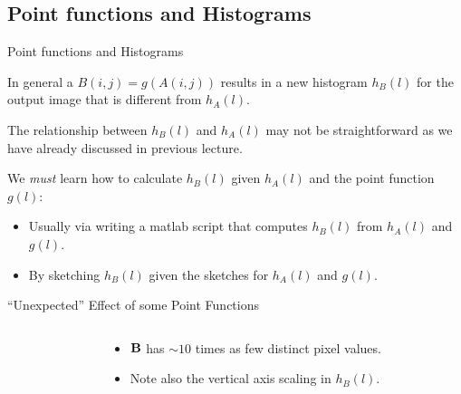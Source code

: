 \subsection{Point functions and Histograms}
%
%
\begin{slide}{Point functions and Histograms}
\begin{titlelist}{}{}

\item<2-> 
In general a  $B(i,j)=g(A(i,j))$
results in a new histogram $h_B(l)$ for the output image
that is different from $h_A(l)$.

\item<3-> 
The relationship between $h_B(l)$ and $h_A(l)$ may not be
straightforward as we have already discussed in previous lecture.

\item<4-> 
We {\em must} learn how to calculate $h_B(l)$ given $h_A(l)$
and the point function $g(l)$:

\begin{itemize}
\item<5-> 
 Usually via writing a matlab script that
computes $h_B(l)$ from $h_A(l)$ and $g(l)$.

\item<6-> 
 By sketching  $h_B(l)$
given the sketches for $h_A(l)$ and $g(l)$.
\end{itemize}

\end{titlelist}
\end{slide}


%
%
\begin{slide}{``Unexpected'' Effect of some Point Functions}
\vspace*{-3ex}
\begin{columns}
\begin{column}{0.6\textwidth}
\end{column}
\begin{column}{0.4\textwidth}
\begin{itemize}
\small
\item<1-> ${\bf B}$ has $\sim 10$ times as few distinct pixel values.
\item<2-> Note also the vertical axis scaling in $h_B(l)$.
\end{itemize}
\end{column}
\end{columns}
\end{slide}

